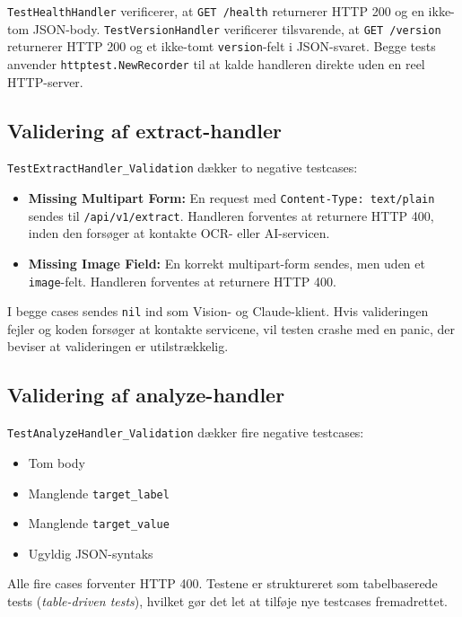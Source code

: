 \texttt{TestHealthHandler} verificerer, at \texttt{GET /health} returnerer HTTP 200 og en ikke-tom JSON-body. \texttt{TestVersionHandler} verificerer tilsvarende, at \texttt{GET /version} returnerer HTTP 200 og et ikke-tomt \texttt{version}-felt i JSON-svaret. Begge tests anvender \texttt{httptest.NewRecorder} til at kalde handleren direkte uden en reel HTTP-server.

\subsection{Validering af extract-handler}
\label{subsec:extract-test}

\texttt{TestExtractHandler\_Validation} dækker to negative testcases:

\begin{itemize}
  \item \textbf{Missing Multipart Form:} En request med \texttt{Content-Type: text/plain} sendes til \texttt{/api/v1/extract}. Handleren forventes at returnere HTTP 400, inden den forsøger at kontakte OCR- eller AI-servicen.
  \item \textbf{Missing Image Field:} En korrekt multipart-form sendes, men uden et \texttt{image}-felt. Handleren forventes at returnere HTTP 400.
\end{itemize}

I begge cases sendes \texttt{nil} ind som Vision- og Claude-klient. Hvis valideringen fejler og koden forsøger at kontakte servicene, vil testen crashe med en panic, der beviser at valideringen er utilstrækkelig.

\subsection{Validering af analyze-handler}
\label{subsec:analyze-test}

\texttt{TestAnalyzeHandler\_Validation} dækker fire negative testcases:

\begin{itemize}
  \item Tom body
  \item Manglende \texttt{target\_label}
  \item Manglende \texttt{target\_value}
  \item Ugyldig JSON-syntaks
\end{itemize}

Alle fire cases forventer HTTP 400. Testene er struktureret som tabelbaserede tests (\textit{table-driven tests}), hvilket gør det let at tilføje nye testcases fremadrettet.

